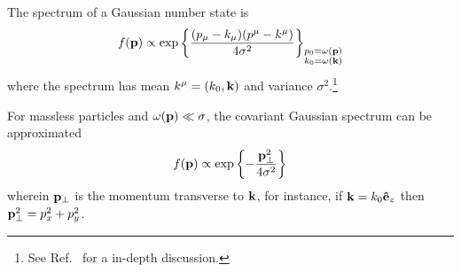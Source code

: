 \begin{definition}
	The spectrum of a Gaussian number state is
	\begin{equation}
		f(\vb{p})
		\propto
		\exp\left\{
			\frac{(p_\mu-k_\mu)(p^\mu-k^\mu)}{4\sigma^2}
		\right\}_{\substack{p_0=\omega(\vb{p})\\k_0=\omega(\vb{k})}}
		\label{eq:covariant_gaussian_spectrum}
	\end{equation}
	where the spectrum has mean $k^\mu=(k_0,\vb{k})$ and variance $\sigma^2$.\footnote{See Ref.~\cite{Naumov2013,Naumov2009} for a in-depth discussion.}
\end{definition}
\begin{lemma}\label{thm:non_relativistic_gaussian_momentum}
	For massless particles and $\omega(\vb{p})\ll\sigma$, the covariant Gaussian spectrum can be approximated
	\begin{equation}
		f(\vb{p})
		\propto
		\exp\left\{
			-
			\frac{
				\vb{p}_\perp^2
			}{4\sigma^2}
		\right\}
	\end{equation}
	wherein $\vb{p}_\perp$ is the momentum transverse to $\vb{k}$, for instance, if $\vb{k}=k_0\vu{e}_z$ then $\vb{p}_\perp^2=p_x^2+p_y^2$.
\end{lemma}
